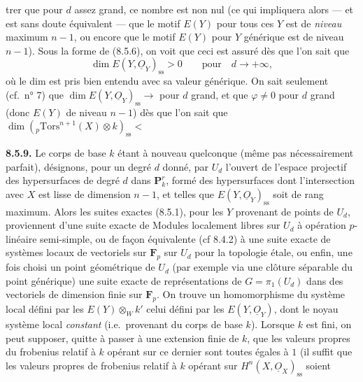 \documentclass[11pt,a4paper]{article}
\begin{document}
trer que pour $d$ assez grand, ce nombre est non nul (ce qui impliquera alors
--- et est sans doute équivalent --- que le motif $E(Y)$ pour tous ces $Y$ est
de \emph{niveau} maximum $n - 1$, ou encore que le motif $E(Y)$ pour $Y$
générique est de niveau $n - 1$). Sous la forme de (8.5.6), on voit que ceci
est assuré dès que l'on sait que
\[
\dim E(Y, \underline{O}_{Y})_{\mathrm{ss}} > 0 \qquad \text{pour} \quad
d \to +\infty ,
\]
où le dim est pris bien entendu avec sa valeur générique.
On sait seulement (cf.\ n° 7) que $\dim E(Y,
\underline{O}_{Y})_{\mathrm{ss}} \to$ \ill{} pour $d$ grand, et que
$\varphi \neq 0$ pour $d$ grand (donc $E(Y)$ de niveau $n - 1$) dès que l'on
sait que $\dim ({}_{p}\mathrm{Tors}^{n+1}(X) \otimes k)_{\mathrm{ss}} <$
 \ill{}


\textbf{8.5.9.} Le corps de base $k$ étant à nouveau quelconque (même pas
nécessairement parfait), désignons, pour un degré $d$ donné, par $U_{d}$
l'ouvert de l'espace projectif des hypersurfaces de degré $d$ dans
$\mathbf{P}^{r}_{k}$, formé des hypersurfaces dont l'intersection avec $X$ est
lisse de dimension $n - 1$, et telles que $E(Y, \underline{O}_{Y})_{\mathrm{ss}}$
soit de rang maximum. Alors les suites exactes (8.5.1), pour les $Y$ provenant
de points de $U_{d}$, proviennent d'une suite exacte de Modules localement
libres sur $U_{d}$ à opération $p$-linéaire semi-simple, ou de façon
équivalente (cf 8.4.2) à une suite exacte de systèmes locaux de vectoriels sur
$\mathbf{F}_{p}$ sur $U_{d}$ pour la topologie étale, ou enfin, une fois choisi
un point géométrique de $U_{d}$ (par exemple via une clôture séparable du point
générique) une suite exacte de représentations de $G = \pi_{1}(U_{d})$ dans des
vectoriels de dimension finie sur $\mathbf{F}_{p}$. On trouve un homomorphisme
\add{$\varphi$} du système local défini par les $E(Y) \otimes_{W} k'$
  celui défini par les $E(Y, \underline{O}_{Y})$, dont le
noyau   système local
\emph{constant} (i.e.\ provenant du corps de base $k$). Lorsque $k$ est fini, on
peut supposer, quitte à passer à une extension finie de $k$, que les valeurs
propres du frobenius relatif à $k$ opérant sur ce dernier sont toutes égales à
$1$ (il suffit que les valeurs propres de frobenius relatif à $k$ opérant sur
$H^{n}(X, \underline{O}_{X})_{\mathrm{ss}}$  soient
\end{document}
